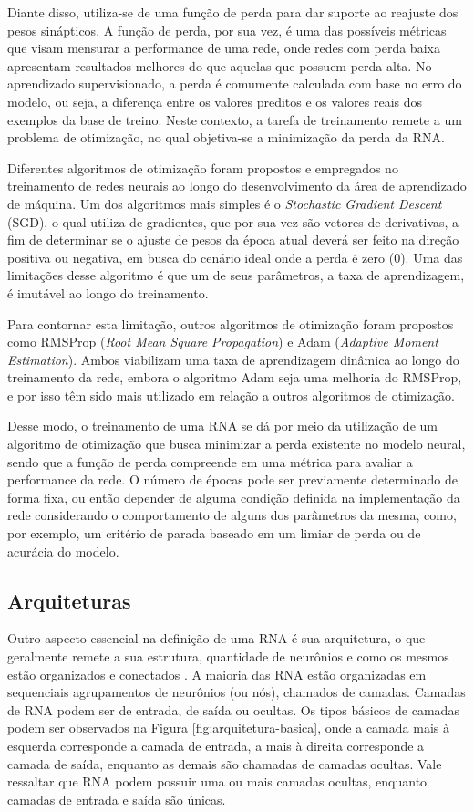 Diante disso, utiliza-se de uma função de perda para dar suporte ao reajuste dos pesos sinápticos. A função de perda, por sua vez, é uma das possíveis métricas que visam mensurar a performance de uma rede, onde redes com perda baixa apresentam resultados melhores do que aquelas que possuem perda alta. No aprendizado supervisionado, a perda é comumente calculada com base no erro do modelo, ou seja, a diferença entre os valores preditos e os valores reais dos exemplos da base de treino. Neste contexto, a tarefa de treinamento remete a um problema de otimização, no qual objetiva-se a minimização da perda da RNA.

Diferentes algoritmos de otimização foram propostos e empregados no treinamento de redes neurais ao longo do desenvolvimento da área de aprendizado de máquina. Um dos algoritmos mais simples é o \textit{Stochastic Gradient Descent} (SGD), o qual utiliza de gradientes, que por sua vez são vetores de derivativas, a fim de determinar se o ajuste de pesos da época atual deverá ser feito na direção positiva ou negativa, em busca do cenário ideal onde a perda é zero (0). Uma das limitações desse algoritmo é que um de seus parâmetros, a taxa de aprendizagem, é imutável ao longo do treinamento.

Para contornar esta limitação, outros algoritmos de otimização foram propostos como RMSProp (\textit{Root Mean Square Propagation}) e Adam (\textit{Adaptive Moment Estimation}). Ambos viabilizam uma taxa de aprendizagem dinâmica ao longo do treinamento da rede, embora o algoritmo Adam seja uma melhoria do RMSProp, e por isso têm sido mais utilizado em relação a outros algoritmos de otimização.

Desse modo, o treinamento de uma RNA se dá por meio da utilização de um algoritmo de otimização que busca minimizar a perda existente no modelo neural, sendo que a função de perda compreende em uma métrica para avaliar a performance da rede. O número de épocas pode ser previamente determinado de forma fixa, ou então depender de alguma condição definida na implementação da rede considerando o comportamento de alguns dos parâmetros da mesma, como, por exemplo, um critério de parada baseado em um limiar de perda ou de acurácia do modelo.

\subsection{Arquiteturas}
Outro aspecto essencial na definição de uma RNA é sua arquitetura, o que geralmente remete a sua estrutura, quantidade de neurônios e como os mesmos estão organizados e conectados \cite{goodfellow2016}. A maioria das RNA estão organizadas em sequenciais agrupamentos de neurônios (ou nós), chamados de camadas. Camadas de RNA podem ser de entrada, de saída ou ocultas. Os tipos básicos de camadas podem ser observados na Figura \ref{fig:arquitetura-basica}, onde a camada mais à esquerda corresponde a camada de entrada, a mais à direita corresponde a camada de saída, enquanto as demais são chamadas de camadas ocultas. Vale ressaltar que RNA podem possuir uma ou mais camadas ocultas, enquanto camadas de entrada e saída são únicas.

